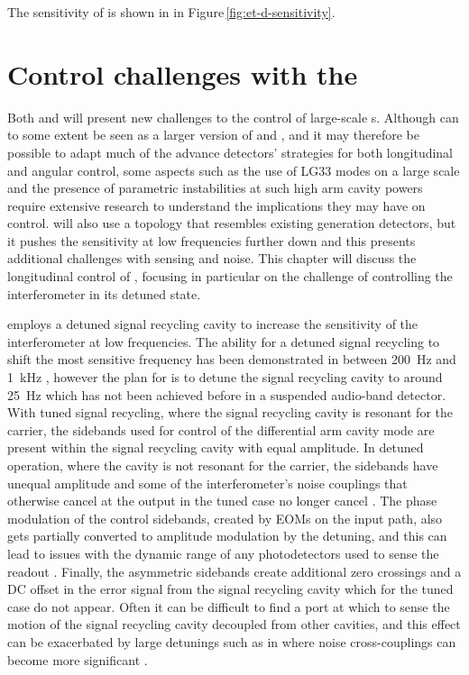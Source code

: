 The sensitivity of \ETHF{} is shown in  in Figure\,\ref{fig:et-d-sensitivity}.

\section{\label{sec:et-lf-control-challenges}Control challenges with the \ET{}}
Both \ETLF{} and \ETHF{} will present new challenges to the control of large-scale \DRFPMI{}s. Although \ETHF{} can to some extent be seen as a larger version of \ALIGO{} and \AVIRGO{}, and it may therefore be possible to adapt much of the advance detectors' strategies for both longitudinal and angular control, some aspects such as the use of LG33 modes on a large scale and the presence of parametric instabilities at such high arm cavity powers \cite{Evans2015} require extensive research to understand the implications they may have on control. \ETLF{} will also use a topology that resembles existing generation detectors, but it pushes the sensitivity at low frequencies further down and this presents additional challenges with sensing and noise. This chapter will discuss the longitudinal control of \ETLF{}, focusing in particular on the challenge of controlling the interferometer in its detuned state.

\ETLF{} employs a detuned signal recycling cavity to increase the sensitivity of the interferometer at low frequencies. The ability for a detuned signal recycling to shift the most sensitive frequency has been demonstrated in \GEO{} between \SI{200}{\hertz} and \SI{1}{\kilo\hertz} \cite{Hild2006}, however the plan for \ETLF{} is to detune the signal recycling cavity to around \SI{25}{\hertz} which has not been achieved before in a suspended audio-band detector. With tuned signal recycling, where the signal recycling cavity is resonant for the carrier, the sidebands used for control of the differential arm cavity mode are present within the signal recycling cavity with equal amplitude. In detuned operation, where the cavity is not resonant for the carrier, the sidebands have unequal amplitude and some of the interferometer's noise couplings that otherwise cancel at the output in the tuned case no longer cancel \cite{Hild2007}. The phase modulation of the control sidebands, created by \glspl{EOM} on the input path, also gets partially converted to amplitude modulation by the detuning, and this can lead to issues with the dynamic range of any photodetectors used to sense the readout \cite{Grote2007}. Finally, the asymmetric sidebands create additional zero crossings and a \gls{DC} offset in the error signal from the signal recycling cavity which for the tuned case do not appear. Often it can be difficult to find a port at which to sense the motion of the signal recycling cavity decoupled from other cavities, and this effect can be exacerbated by large detunings such as in \ETLF{} where noise cross-couplings can become more significant \cite{Hild2007}.

